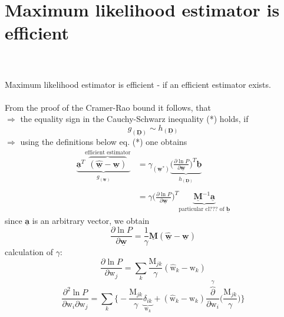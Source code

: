 \documentclass[a4paper,11pt]{article}
\begin{document}
\section{Maximum likelihood estimator is efficient}
\\\\
Maximum likelihood estimator is efficient - if an efficient estimator exists.\\\\
From the proof of the Cramer-Rao bound it follows, that\\
$\Rightarrow$ the equality sign in the Cauchy-Schwarz inequality (*) holds, if
\[ g_{(\underline{\mathbf{D}})} \sim h_{(\underline{\mathbf{D}})}
\]
$\Rightarrow$ using the definitions below eq. (*) one obtains
\begin{equation}
	\begin{array}{ll}
	\underbrace{\underline{\mathbf{a}}^T 
		\overbrace{(\hat{\underline{\mathbf{w}}} - 
			\underline{\mathbf{w}})}^{\text{efficient estimator}}}_{
				g_{(\underline{\mathbf{w}})}} 
	& = \gamma_{(\underline{\mathbf{w}}^*)} 
		\underbrace{
		\bigg( \frac{\partial \ln P}{\partial \underline{\mathbf{w}}}
		\bigg)^T \underline{\mathbf{b}} }_{
			h_{(\underline{\mathbf{D}})} }\\\\
	& = \gamma \Big( \frac{\partial \ln P}{\partial \underline{\mathbf{w}}}
		\Big)^T \underbrace{ \underline{\mathbf{M}}^{-1} 
			\underline{\mathbf{a}} }_{\text{particular cl??? of }
				\underline{\mathbf{b}}}
	\end{array}
\end{equation}
since $\underline{\mathbf{a}}$ is an arbitrary vector, we obtain
\begin{equation}
	\frac{\partial \ln P}{\partial \underline{\mathbf{w}}}
	= \frac{1}{\gamma} \underline{\mathbf{M}} (\hat{\underline{\mathbf{w}}}
		- \underline{\mathbf{w}})
\end{equation}
calculation of $\gamma$:
\begin{equation}
	\frac{\partial \ln P}{\partial \mathrm{w}_j} 
	= \sum_k \frac{\mathrm{M}_{jk}}{\gamma} 
		(\hat{\mathrm{w}}_k - \mathrm{w}_k)
\end{equation}
\begin{equation}
	\frac{\partial^2 \ln P}{\partial \mathrm{w}_i \partial \mathrm{w}_j}
	= \sum_k \bigg\{ -\frac{\mathrm{M}_{jk}}{\gamma} 
		\underbrace{ \delta_{ik} }_{\mathrm{w}_k}
		+ (\hat{\mathrm{w}}_k - \mathrm{w}_k)
		\frac{\overbrace{\partial}^{\gamma}}{\partial \mathrm{w}_i} 
		\bigg( \frac{\mathrm{M}_{jk}}{\gamma} \bigg)
		\bigg\}
\end{equation}
\end{document}
